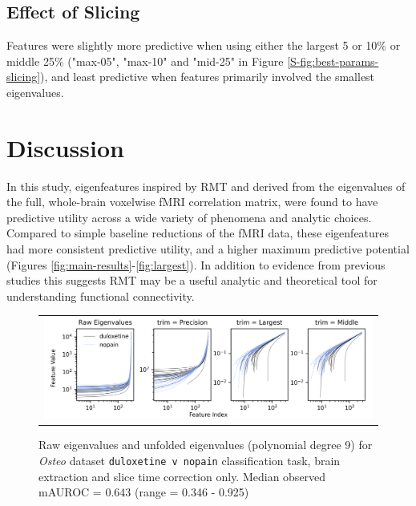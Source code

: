 \documentclass[12pt]{spieman}  %
\begin{document}
\begin{spacing}{2}
\subsection{Effect of Slicing}
Features were slightly more predictive when using either the largest 5 or 10\% or middle
25\% ("max-05", "max-10" and "mid-25" in Figure
\ref{S-fig:best-params-slicing}), and least predictive when features primarily
involved the smallest eigenvalues.


\section{Discussion}

In this study, eigenfeatures inspired by RMT and derived from the eigenvalues
of the full, whole-brain voxelwise fMRI correlation matrix, were found to have
predictive utility across a wide variety of phenomena and analytic choices.
Compared to simple baseline reductions of the fMRI data, these eigenfeatures
had more consistent predictive utility, and a higher maximum predictive
potential (Figures \ref{fig:main-results}-\ref{fig:largest}). In addition to
evidence from previous studies
\cite{sebaRandomMatrixAnalysis2003,wangRandomMatrixTheory2016,matharooSpontaneousBackpainAlters2020}
this suggests RMT may be a useful analytic and theoretical tool for
understanding functional connectivity.

\begin{figure}
\begin{center}
\begin{tabular}{c}
\includegraphics[width=6.5in]{unfolded_osteo_duloxetine_v_nopain.png}
\end{tabular}
\end{center}
\caption
{ \label{fig:unfolded} Raw eigenvalues and unfolded eigenvalues (polynomial
degree 9) for \textit{Osteo} dataset \footnotesize\texttt{duloxetine v nopain}
classification task, brain extraction and slice time correction only. Median
observed mAUROC = 0.643 (range = 0.346 - 0.925)}
\end{figure}


\end{spacing}
\end{document}
